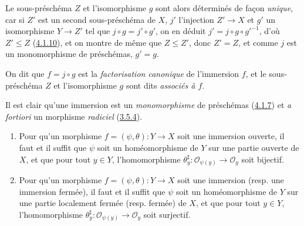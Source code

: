 Le sous-préschéma $Z$ et l'isomorphisme $g$ sont alors déterminés de façon
\emph{unique}, car si $Z'$ est un second sous-préschéma de $X$, $j'$ l'injection
$Z'\to X$ et $g'$ un isomorphisme $Y\to Z'$ tel que
$j\circ g=j'\circ g'$, on en déduit $j'=j\circ g\circ {g'}^{-1}$, d'où
$Z'\leq Z$ (\hyperref[I.4.1.10-fr]{4.1.10}), et on montre de même que
$Z\leq Z'$, donc $Z'=Z$, et comme $j$ est un monomorphisme de préschémas,
$g'=g$.

On dit que $f=j\circ g$ est la \emph{factorisation canonique} de l'immersion
$f$, et le sous-préschéma $Z$ et l'isomorphisme $g$ sont dits
\emph{associés à $f$}.

Il est clair qu'une immersion est un \emph{monomorphisme} de préschémas
(\hyperref[I.4.1.7-fr]{4.1.7}) et \emph{a fortiori} un morphisme
\emph{radiciel} (\hyperref[I.3.5.4-fr]{3.5.4}).

\begin{proposition}[4.2.2]
\label{I.4.2.2-fr}
\begin{enumerate}
  \item[\textup{a)}] Pour qu'un morphisme $f=(\psi,\theta):Y\to X$ soit une
  immersion ouverte, il faut et il suffit que $\psi$ soit un
  homéomorphisme de $Y$ sur une partie ouverte de $X$, et que pour tout
  $y\in Y$, l'homomorphisme
  $\theta_y^\sharp:\mathscr{O}_{\psi(y)}\to\mathscr{O}_y$ soit bijectif.
  \item[\textup{b)}] Pour qu'un morphisme $f=(\psi,\theta):Y\to X$ soit une
  immersion (\textup{resp.} une immersion fermée), il faut et il suffit
  que $\psi$ soit un homéomorphisme de $Y$ sur une partie localement fermée
  (\textup{resp.} fermée) de $X$, et que pour tout $y\in Y$, l'homomorphisme
  $\theta_y^\sharp:\mathscr{O}_{\psi(y)}\to\mathscr{O}_y$ soit surjectif.
\end{enumerate}
\end{proposition}

